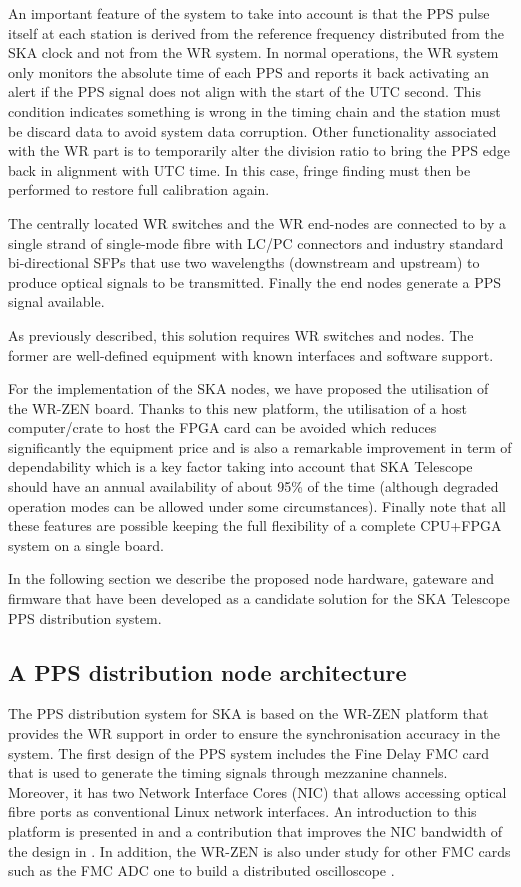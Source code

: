 An important feature of the system to take into account is that the PPS pulse itself at each station is derived from the reference frequency distributed from the SKA clock and not from the WR system. In normal operations, the WR system only monitors the absolute time of each PPS and reports it back activating an alert if the PPS signal does not align with the start of the UTC second. This condition indicates something is wrong in the timing chain and the station must be discard data to avoid system data corruption. Other functionality associated with the WR part is to temporarily alter the division ratio to bring the PPS edge back in alignment with UTC time. In this case, fringe finding must then be performed to restore full calibration again.

The centrally located WR switches and the WR end-nodes are connected to by a 
single strand of single-mode fibre with LC/PC connectors and industry standard 
bi-directional SFPs that use two wavelengths (downstream and upstream) to produce 
optical signals to be transmitted. Finally the end nodes generate a PPS signal available. 

As previously described, this solution requires WR switches and nodes. The former are well-defined equipment with known interfaces and software support. 

For the implementation of the SKA nodes, we have proposed the utilisation of the WR-ZEN board. Thanks to this new platform, the utilisation of a host computer/crate to host the FPGA card can be avoided which reduces significantly the equipment price and is also a remarkable improvement in term of dependability which is a key factor taking into account that SKA Telescope should have an annual availability of about 95\% of the time (although degraded operation modes can be allowed under some circumstances).
Finally note that all these features are possible keeping the full flexibility of a complete CPU+FPGA system on a single board. 

In the following section we describe the proposed node hardware, gateware and firmware that have been developed as a candidate solution for the SKA Telescope PPS distribution system. 

\subsection{A PPS distribution node architecture} \label{subsec:ska-pps-system-arch}

The PPS distribution system for SKA is based on the WR-ZEN platform that provides the WR support in order to ensure the synchronisation accuracy in the system. The first design of the PPS system includes the Fine Delay FMC card that is used to generate the timing signals through mezzanine channels. Moreover, it has two Network Interface Cores (NIC) that allows accessing optical fibre ports as conventional Linux network interfaces. An introduction to this platform is presented in \cite{migueljl-paper-wr-zen-intro} and a contribution that improves the NIC bandwidth of the design in \cite{jorgesg-paper-wr-zen-dma}. In addition, the WR-ZEN is also under study for other FMC cards such as the FMC ADC one to build a distributed oscilloscope \cite{joselj-paper-wr-zen-adc}.

